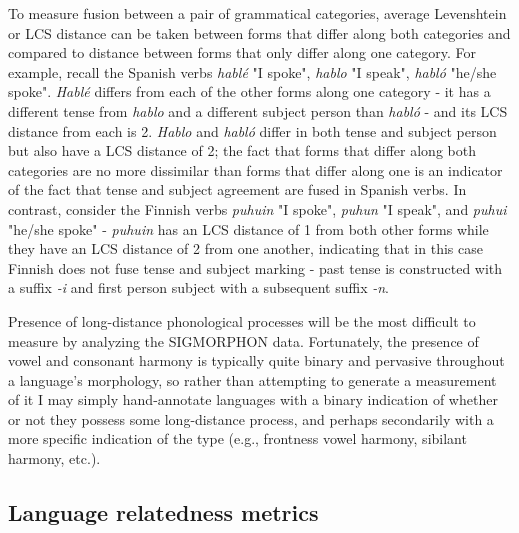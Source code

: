 To measure fusion between a pair of grammatical categories, average Levenshtein or LCS distance can be taken between forms that differ along both categories and compared to distance between forms that only differ along one category. For example, recall the Spanish verbs \textit{hablé} "I spoke", \textit{hablo} "I speak", \textit{habló} "he/she spoke". \textit{Hablé} differs from each of the other forms along one category - it has a different tense from \textit{hablo} and a different subject person than \textit{habló} - and its LCS distance from each is 2. \textit{Hablo} and \textit{habló} differ in both tense and subject person but also have a LCS distance of 2; the fact that forms that differ along both categories are no more dissimilar than forms that differ along one is an indicator of the fact that tense and subject agreement are fused in Spanish verbs. In contrast, consider the Finnish verbs \textit{puhuin} "I spoke", \textit{puhun} "I speak", and \textit{puhui} "he/she spoke" - \textit{puhuin} has an LCS distance of 1 from both other forms while they have an LCS distance of 2 from one another, indicating that in this case Finnish does not fuse tense and subject marking - past tense is constructed with a suffix \textit{-i} and first person subject with a subsequent suffix \textit{-n}.

Presence of long-distance phonological processes will be the most difficult to measure by analyzing the SIGMORPHON data. Fortunately, the presence of vowel and consonant harmony is typically quite binary and pervasive throughout a language's morphology, so rather than attempting to generate a measurement of it I may simply hand-annotate languages with a binary indication of whether or not they possess some long-distance process, and perhaps secondarily with a more specific indication of the type (e.g., frontness vowel harmony, sibilant harmony, etc.).

\subsection{Language relatedness metrics}

